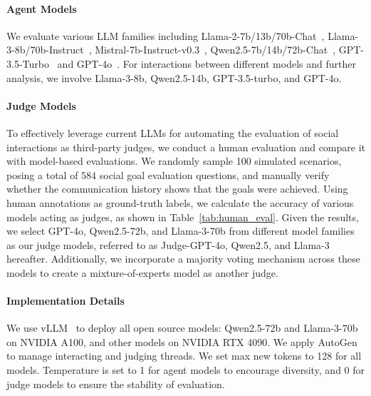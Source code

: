 \paragraph{Agent Models}
We evaluate various LLM families including Llama-2-7b/13b/70b-Chat~\cite{touvron2023llama}, Llama-3-8b/70b-Instruct~\cite{dubey2024llama}, Mistral-7b-Instruct-v0.3~\cite{jiang2023mistral}, Qwen2.5-7b/14b/72b-Chat~\cite{qwen2.5}, GPT-3.5-Turbo~\cite{ouyang2022training} and GPT-4o~\cite{achiam2023gpt}.
For interactions between different models and further analysis, we involve Llama-3-8b, Qwen2.5-14b, GPT-3.5-turbo, and GPT-4o. 

\paragraph{Judge Models}
To effectively leverage current LLMs for automating the evaluation of social interactions as third-party judges, we conduct a human evaluation and compare it with model-based evaluations.
We randomly sample 100 simulated scenarios, posing a total of 584 social goal evaluation questions, and manually verify whether the communication history shows that the goals were achieved.
Using human annotations as ground-truth labels, we calculate the accuracy of various models acting as judges, as shown in Table~\ref{tab:human_eval}.
Given the results, we select GPT-4o, Qwen2.5-72b, and Llama-3-70b from different model families as our judge models, referred to as Judge-GPT-4o, Qwen2.5, and Llama-3 hereafter.
Additionally, we incorporate a majority voting mechanism across these models to create a mixture-of-experts model as another judge.

\paragraph{Implementation Details}
We use vLLM~\citep{kwon2023efficient} to deploy all open source models: Qwen2.5-72b and Llama-3-70b on NVIDIA A100, and other models on NVIDIA RTX 4090.
We apply AutoGen~\cite{wu2024autogen} to manage interacting and judging threads.
We set max new tokens to 128 for all models.
Temperature is set to 1 for agent models to encourage diversity, and 0 for judge models to ensure the stability of evaluation.